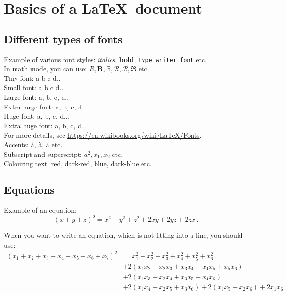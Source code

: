 \documentclass[11pt,leqno]{amsart}
\numberwithin{equation}{subsection}
\theoremstyle{definition}
\begin{document}
\section{Basics of a \LaTeX\ document}
\subsection{Different types of fonts}
Example of various font styles: 
{\it italics}, {\bf bold}, {\tt type writer font} etc. \\ 
In math mode, you can use: $R, \mathbf{R}, \mathbb{R}, \mathcal{R}, \mathscr{R}, \mathfrak{R}$ etc. \\ 
Tiny font: {\tiny a b c d..} \\ 
Small font: {\small a b c d..} \\ 
Large font: {\large a, b, c, d..} \\ 
Extra large font: {\Large a, b, c, d...} \\ 
Huge font: {\huge a, b, c, d...} \\ 
Extra huge font: {\Huge a, b, c, d...} \\ 
For more details, see \href{https://en.wikibooks.org/wiki/LaTeX/Fonts}{https://en.wikibooks.org/wiki/LaTeX/Fonts}. \\ 
Accents: \'a, \`a, \"a etc. \\ 
Subscript and superscript: $a^2, x_1, x_2$ etc. \\ 
Colouring text: {\color{red} red}, {\color{mdtRed} dark-red}, {\color{blue} blue}, {\color{dblue} dark-blue} etc. \\ 


\subsection{Equations}
Example of an equation: 
\begin{equation}
(x+y+z)^2 = x^2+y^2+z^2+2xy+2yz+2zx\,. 
\end{equation}

\noindent
When you want to write an equation, which is not fitting into a line, you should use: 
\begin{align}
(x_1 + x_2 + x_3 + x_4 + x_5 + x_6 + x_7)^2 
& = x_1^2 + x_2^2 + x_3^2 + x_4^2 + x_5^2 + x_6^2 \nonumber \\ 
& + 2(x_1x_2 + x_2x_3 + x_3x_4 + x_4x_5 + x_5x_6) \nonumber \\ 
& + 2(x_1x_3 + x_2x_4 + x_3x_5 + x_4x_6)  \\ 
& + 2(x_1x_4 + x_2x_5 + x_3x_6) + 2(x_1x_5 + x_2x_6) + 2x_1x_6 \nonumber 
\end{align}
\end{document}
